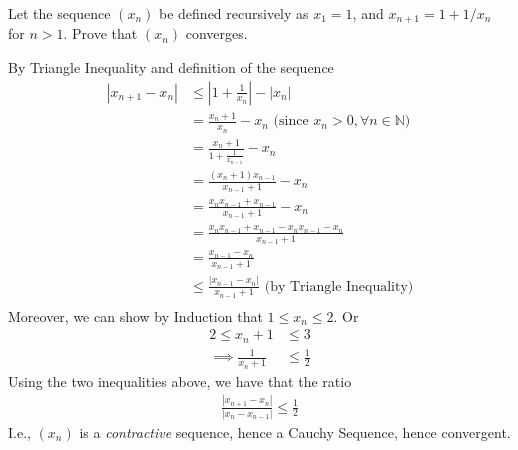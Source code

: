 \documentclass[boxes, qed]{homework}
\begin{document}
\begin{problem}Let the sequence $(x_n)$ be defined recursively 
  as $x_1=1$, and $x_{n+1}=1+1/x_n$ for $n>1$. Prove that $(x_n)$ converges.
\end{problem}
\begin{solution}By Triangle Inequality and definition of the sequence
  \begin{align*}
    |x_{n+1}-x_n| 
      &\le |1+\frac{1}{x_n}| - |x_n|\\
      &= \frac{x_n+1}{x_n} - x_n
        \text{ (since $x_n>0, \forall{n\in{\mathbb{N}}}$)}\\
      &= \frac{x_n+1}{1+\frac{1}{x_{n-1}}} - x_n\\
      &= \frac{(x_n+1)x_{n-1}}{x_{n-1}+1} - x_n\\
      &= \frac{x_n x_{n-1} + x_{n-1}}{x_{n-1}+1} - x_n\\
      &= \frac{x_n x_{n-1} + x_{n-1} - x_n x_{n-1} -x_n}{x_{n-1}+1}\\
      &= \frac{x_{n-1} - x_n}{x_{n-1}+1}\\
      &\le \frac{|x_{n-1} - x_n|}{x_{n-1}+1}
        \text{ (by Triangle Inequality)}\\
  \end{align*}
  Moreover, we can show by Induction that
  $1\le{x_n}\le{2}$. Or
  \begin{align*}
    2 \le x_n+1 &\le 3\\
    \implies \frac{1}{x_n+1} &\le \frac{1}{2}
  \end{align*}
  Using the two inequalities above, we have that the ratio
  \begin{align*}
    \frac{|x_{n+1}-x_n|}{|x_n - x_{n-1}|}
      \le \frac{1}{2}
  \end{align*}
  I.e., $(x_n)$ is a \textit{contractive} sequence, hence a Cauchy Sequence, hence convergent.
\end{solution}
\end{document}
